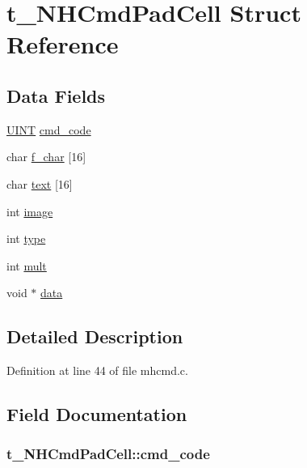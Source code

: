\hypertarget{structt__NHCmdPadCell}{\section{t\+\_\+\+N\+H\+Cmd\+Pad\+Cell Struct Reference}
\label{structt__NHCmdPadCell}
}
\subsection*{Data Fields}
\begin{DoxyCompactItemize}
\item 
\hyperlink{def__os2_8h_a36cb3b01d81ffd844bbbfb54003e06ec}{U\+I\+N\+T} \hyperlink{structt__NHCmdPadCell_a977ab851d103729606f7db806036c484}{cmd\+\_\+code}
\item 
char \hyperlink{structt__NHCmdPadCell_a03333f37c5d2acc1a4fd2b632526ceac}{f\+\_\+char} \mbox{[}16\mbox{]}
\item 
char \hyperlink{structt__NHCmdPadCell_ac4dbb4412979fff9f460a05132632e22}{text} \mbox{[}16\mbox{]}
\item 
int \hyperlink{structt__NHCmdPadCell_aef91a1adf61e7b83fff7a4cf53b559a7}{image}
\item 
int \hyperlink{structt__NHCmdPadCell_a464e4e2f7bac75b51641f975a4e7d7c1}{type}
\item 
int \hyperlink{structt__NHCmdPadCell_af9f8628557b1a7272f4422d218bd020f}{mult}
\item 
void $\ast$ \hyperlink{structt__NHCmdPadCell_afbd70b8dedd4bc61fcf142c8b673f02e}{data}
\end{DoxyCompactItemize}


\subsection{Detailed Description}


Definition at line 44 of file mhcmd.\+c.



\subsection{Field Documentation}
\hypertarget{structt__NHCmdPadCell_a977ab851d103729606f7db806036c484}{
\subsubsection[{cmd\+\_\+code}]{ t\+\_\+\+N\+H\+Cmd\+Pad\+Cell\+::cmd\+\_\+code}}\label{structt__NHCmdPadCell_a977ab851d103729606f7db806036c484}


